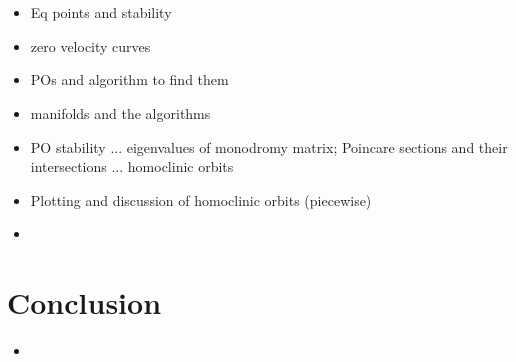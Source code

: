 \documentclass[11pt]{article} %
\begin{document}
\section*{\color{red}{Periodic/Homoclinic Orbits}}
\begin{itemize}
	\item \color{red}Eq points and stability
	\item zero velocity curves
	\item POs and algorithm to find them
	\item manifolds and the algorithms
	\item PO stability ... eigenvalues of monodromy matrix; Poincare sections and their intersections ... homoclinic orbits
	\item Plotting and discussion of homoclinic orbits (piecewise)
	\item \color{black}
\end{itemize}

\section*{Conclusion}
\begin{itemize}
	\item \color{red}{Homoclinic orbits are cool/interesting, but for spacecraft applications they aren't very useful; Heteroclinic orbits are useful fa show}\color{black}
\end{itemize}

\newpage


\end{document}
